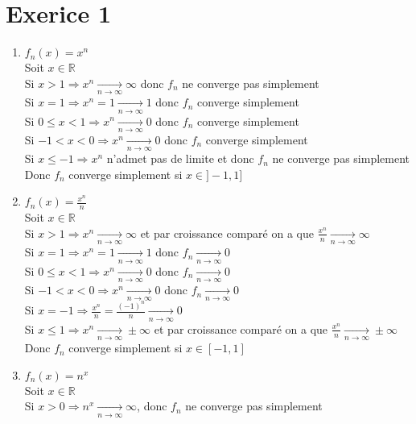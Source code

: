 \documentclass{article}
\author{Frederic Becerril}
\newcommand{\mylim}[2]{\underset{#1 \rightarrow #2}{\longrightarrow}}
\begin{document}
\part*{Exerice 1}

\begin{enumerate}[label=\alph*)]
    \item $f_n(x) = x^n$\\
        Soit $x \in \mathbb{R}$\\
        Si $x > 1 \Rightarrow x^n \mylim{n}{\infty} \infty$ donc $f_n$ ne converge pas simplement\\
        Si $x = 1 \Rightarrow x^n = 1 \mylim{n}{\infty} 1$ donc $f_n$ converge simplement\\
        Si $0 \leq x < 1 \Rightarrow x^n \mylim{n}{\infty} 0$ donc $f_n$ converge simplement\\
        Si $-1 < x < 0 \Rightarrow x^n \mylim{n}{\infty} 0$ donc $f_n$ converge simplement\\
        Si $x \leq -1 \Rightarrow x^n$ n'admet pas de limite et donc $f_n$ ne converge pas simplement\\
        Donc $f_n$ converge simplement si $x \in ]-1, 1]$
    \item $f_n(x) = \frac{x^n}{n}$\\
        Soit $x \in \mathbb{R}$\\
        Si $x > 1 \Rightarrow x^n \mylim{n}{\infty} \infty$ et par croissance comparé on a que $\frac{x^n}{n} \mylim{n}{\infty} \infty$\\
        Si $x = 1 \Rightarrow x^n = 1 \mylim{n}{\infty} 1$ donc $f_n \mylim{n}{\infty} 0$\\
        Si $0 \leq x < 1 \Rightarrow x^n \mylim{n}{\infty} 0$ donc $f_n \mylim{n}{\infty} 0$\\
        Si $-1 < x < 0 \Rightarrow x^n \mylim{n}{\infty} 0$ donc  $f_n \mylim{n}{\infty} 0$\\
        Si $x = -1 \Rightarrow \frac{x^n}{n} = \frac{(-1)^n}{n} \mylim{n}{\infty} 0$\\
        Si $x \leq 1 \Rightarrow x^n \mylim{n}{\infty} \pm \infty$ et par croissance comparé on a que $\frac{x^n}{n} \mylim{n}{\infty} \pm \infty$\\
        Donc $f_n$ converge simplement si $x \in [-1, 1]$
    \item  $f_n(x) = n^x$\\
        Soit $x \in \mathbb{R}$\\
        Si $x > 0 \Rightarrow n^x \mylim{n}{\infty} \infty$, donc $f_n$ ne converge pas simplement\\

\end{enumerate}
\end{document}
